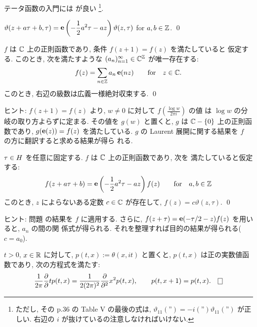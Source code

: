 \documentclass[12pt,twoside]{jarticle}
\begin{document}
\noindent テータ函数の入門には \cite{TataI} が良い%
%
\footnote{ただし, その p.36 の Table V の最後の式は, 
  \( \vartheta_{11}(\text{''}) = -i (\text{''})\vartheta_{11}(\text{''}) \)
  が正しい. 右辺の $i$ が抜けているの注意しなければいけない.}.
%

\begin{question}[準周期性]
  \(\displaystyle
    \vartheta(z + a\tau + b,\tau)
    = \mathop{\mathbf{e}}\nolimits\left( -\frac{1}{2}a^2\tau - az \right) \vartheta(z,\tau)
  \) \quad
  for $a,b\in{\mathbb Z}$.
  \qed
\end{question}

\begin{question}\label{q:periodic-func}
  $f$ は ${\mathbb C}$ 上の正則函数であり, 条件 $f(z+1)=f(z)$ を満たしていると
  仮定する. このとき, 次を満たすような $(a_n)_{n=1}^\infty \in {\mathbb C}^{\mathbb Z}$ 
  が唯一存在する:
  \[
    f(z) = \sum_{n\in{\mathbb Z}} a_n \mathop{\mathbf{e}}\nolimits(nz)
    \qquad\text{for}\quad z \in {\mathbb C}.
  \]%
  このとき, 右辺の級数は広義一様絶対収束する.
  \qed
\end{question}

\noindent ヒント: %
$f(z+1)=f(z)$ より, $w \ne 0$ に対して $f(\frac{\log w}{2\pi i})$ の値
は $\log w$ の分岐の取り方よらずに定まる. その値を $g(w)$ と置くと, 
$g$ は ${\mathbb C}-\{0\}$ 上の正則函数であり, $g(\mathop{\mathbf{e}}\nolimits(z))=f(z)$ を満たしている. 
$g$ の Laurent 展開に関する結果を $f$ の方に翻訳すると求める結果が得ら
れる. 

\begin{question}[準周期性による特徴付け]
  $\tau\in H$ を任意に固定する. $f$ は ${\mathbb C}$ 上の正則函数であり, 次を
  満たしていると仮定する:
  \[
     f(z + a\tau + b)
    = \mathop{\mathbf{e}}\nolimits\left( -\frac{1}{2}a^2\tau - az \right) f(z)
  \qquad\text{for}\quad a,b\in{\mathbb Z}
  \]%
  このとき, $z$ によらないある定数 $c\in{\mathbb C}$ が存在して, %
  $f(z) = c \vartheta(z,\tau)$.
  \qed
\end{question}

\noindent ヒント: 問題  の結果を $f$ に適用する.
さらに, $f(z+\tau) = \mathop{\mathbf{e}}\nolimits(-\tau/2 - z) f(z)$ を用いると, $a_n$ の間の関
係式が得られる. それを整理すれば目的の結果が得られる($c=a_0$).

\begin{question}[熱方程式]
  $t > 0$, $x\in{\mathbb R}$ に対して, $p(t,x) := \theta(x,it)$ と置くと,
  $p(t,x)$ は正の実数値函数であり, 次の方程式を満たす:
  \[
    \frac{1}{2\pi}\pd{}{t} p(t,x) = \frac{1}{2(2\pi)^2}\pd{^2}{x^2} p(t,x),
    \qquad
    p(t,x+1) = p(t,x).
  \qed
  \]%
\end{question}
\end{document}
